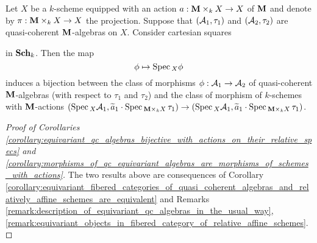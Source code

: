 \begin{corollary}\label{corollary:morphisms_of_qc_equivariant_algebras_are_morphisms_of_schemes_with_actions}
Let $X$ be a $k$-scheme equipped with an action $a:\mathbf{M}\times_kX\rightarrow X$ of $\mathbf{M}$ and denote by $\pi:\mathbf{M}\times_kX\rightarrow X$ the projection. Suppose that $({\mathcal A}_1,\tau_1)$ and $({\mathcal A}_2,\tau_2)$ are quasi-coherent $\mathbf{M}$-algebras on $X$. Consider cartesian squares
\begin{center}
\end{center}
in $\mathbf{Sch}_k$. Then the map
$$\phi \mapsto \mathrm{Spec}\,_X\phi$$
induces a bijection between the class of morphisms $\phi:{\mathcal A}_1\rightarrow {\mathcal A}_2$ of quasi-coherent $\mathbf{M}$-algebras (with respect to $\tau_1$ and $\tau_2$) and the class of morphism of $k$-schemes with $\mathbf{M}$-actions $\left(\mathrm{Spec}\,_X{\mathcal A}_1,\widetilde{a}_1\cdot \mathrm{Spec}\,_{\mathbf{M}\times_kX}\,\tau_1\right)\rightarrow \left(\mathrm{Spec}\,_X{\mathcal A}_1,\widetilde{a}_1\cdot \mathrm{Spec}\,_{\mathbf{M}\times_kX}\,\tau_1\right)$.
\end{corollary}
\begin{proof}[Proof of Corollaries \ref{corollary:equivariant_qc_algebras_bijective_with_actions_on_their_relative_specs} and \ref{corollary:morphisms_of_qc_equivariant_algebras_are_morphisms_of_schemes_with_actions}]
The two results above are consequences of Corollary \ref{corollary:equivariant_fibered_categories_of_quasi_coherent_algebras_and_relatively_affine_schemes_are_equivalent} and Remarks \ref{remark:description_of_equivariant_qc_algebras_in_the_usual_way}, \ref{remark:equivariant_objects_in_fibered_category_of_relative_affine_schemes}.
\end{proof}
